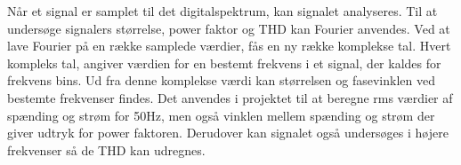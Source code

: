 Når et signal er samplet til det digitalspektrum, kan signalet analyseres. Til at undersøge signalers størrelse, power faktor og THD kan Fourier anvendes. Ved at lave Fourier på en række samplede værdier, fås en ny række komplekse tal. Hvert kompleks tal, angiver værdien for en bestemt frekvens i et signal, der kaldes for frekvens bins. Ud fra denne komplekse værdi kan størrelsen og fasevinklen ved bestemte frekvenser findes. Det anvendes i projektet til at beregne rms værdier af spænding og strøm for 50Hz, men også vinklen mellem spænding og strøm der giver udtryk for power faktoren. Derudover kan signalet også undersøges i højere frekvenser så de THD kan udregnes.  


